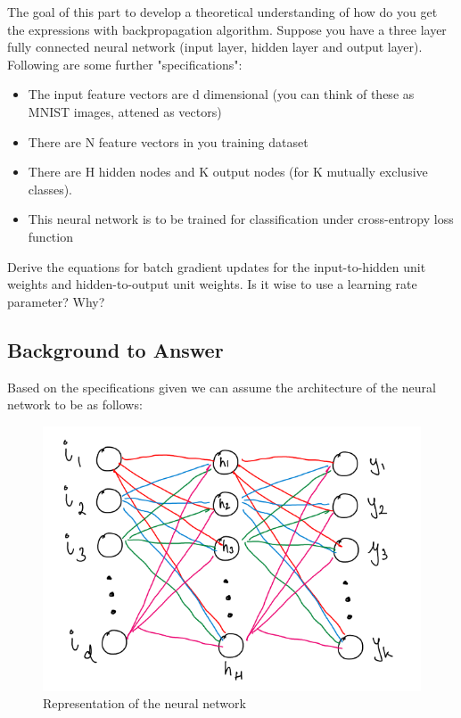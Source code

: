 \documentclass[a4paper, 12pt]{article}
\begin{document}
    The goal of this part to develop a theoretical understanding of how do you get the expressions with
    backpropagation algorithm. Suppose you have a three layer fully connected neural network (input layer,
    hidden layer and output layer). Following are some further "specifications":

    \begin{itemize}
        \item The input feature vectors are d dimensional (you can think of these as MNIST images, attened as vectors)
        \item There are N feature vectors in you training dataset
        \item There are H hidden nodes and K output nodes (for K mutually exclusive classes).
        \item This neural network is to be trained for classification under cross-entropy loss function
    \end{itemize}

    Derive the equations for batch gradient updates for the input-to-hidden unit weights and hidden-to-output
    unit weights. Is it wise to use a learning rate parameter? Why?

    \subsection{Background to Answer}
    
    Based on the specifications given we can assume the architecture of the neural network to be as follows:

    \begin{figure}[h!]
        \centering
        \captionsetup{justification=centering}
        \includegraphics[scale = 0.37]{1.png}
        \caption{Representation of the neural network}
    \end{figure}
    
\end{document}
